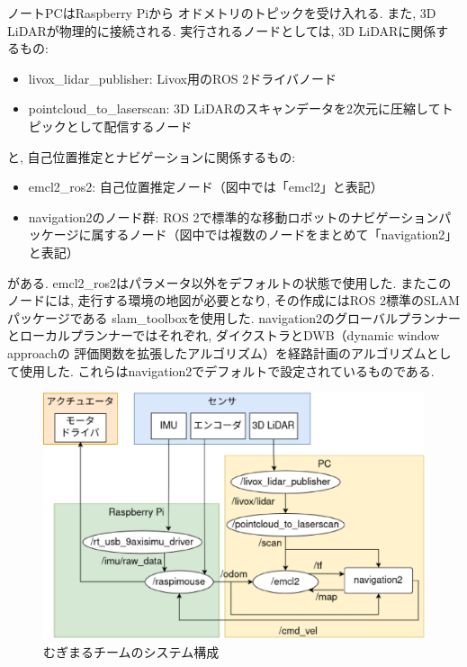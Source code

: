ノートPCはRaspberry Piから
オドメトリのトピックを受け入れる. 
また, 3D LiDARが物理的に接続される. 
実行されるノードとしては, 3D LiDARに関係するもの: 
\begin{itemize}
	\item livox\_lidar\_publisher: Livox用のROS 2ドライバノード
	\item pointcloud\_to\_laserscan: 3D LiDARのスキャンデータを2次元に圧縮してトピックとして配信するノード
\end{itemize}
と, 自己位置推定とナビゲーションに関係するもの: 
\begin{itemize}
	\item emcl2\_ros2: 自己位置推定ノード（図中では「emcl2」と表記）
	\item navigation2\cite{nav2}のノード群: ROS 2で標準的な移動ロボットのナビゲーションパッケージに属するノード（図中では複数のノードをまとめて「navigation2」と表記）
\end{itemize}
がある. 
emcl2\_ros2はパラメータ以外をデフォルトの状態で使用した. 
またこのノードには, 走行する環境の地図が必要となり, 
その作成にはROS 2標準のSLAMパッケージである
slam\_toolbox\cite{slam_toolbox}を使用した. 
navigation2のグローバルプランナーとローカルプランナーではそれぞれ, 
ダイクストラ\cite{dijkstra}とDWB（dynamic window approach\cite{dwa}の
評価関数を拡張したアルゴリズム）を経路計画のアルゴリズムとして使用した. 
これらはnavigation2でデフォルトで設定されているものである. 

\begin{figure}[h]
  \begin{center}
    \includegraphics[width=1.0\linewidth]{figs/mugimaru_system_2024.eps}
    \caption{むぎまるチームのシステム構成}
    \label{fig:mugimaru_system}
  \end{center}
\end{figure}

